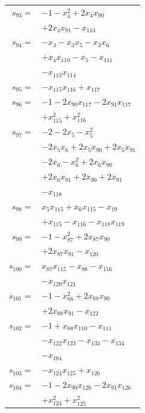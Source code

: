 \begin{longtable}{@{}r@{\;}l@{}}
\(s_{93}=\) & \(\displaystyle -1 -x_{4}^{2} +2x_{4}x_{90}\) \\
 & \(\displaystyle +2x_{4}x_{91} -x_{113}\) \\[3pt]
\(s_{94}=\) & \(\displaystyle -x_{3} -x_{3}x_{5} -x_{3}x_{6}\) \\
 & \(\displaystyle +x_{4}x_{110} -x_{5} -x_{111}\) \\
 & \(\displaystyle -x_{113}x_{114}\) \\[3pt]
\(s_{95}=\) & \(\displaystyle -x_{115}x_{116} +x_{117}\) \\[3pt]
\(s_{96}=\) & \(\displaystyle -1 -2x_{90}x_{117} -2x_{91}x_{117}\) \\
 & \(\displaystyle +x_{115}^{2} +x_{116}^{2}\) \\[3pt]
\(s_{97}=\) & \(\displaystyle -2 -2x_{5} -x_{5}^{2}\) \\
 & \(\displaystyle -2x_{5}x_{6} +2x_{5}x_{90} +2x_{5}x_{91}\) \\
 & \(\displaystyle -2x_{6} -x_{6}^{2} +2x_{6}x_{90}\) \\
 & \(\displaystyle +2x_{6}x_{91} +2x_{90} +2x_{91}\) \\
 & \(\displaystyle -x_{118}\) \\[3pt]
\(s_{98}=\) & \(\displaystyle x_{5}x_{115} +x_{6}x_{115} -x_{19}\) \\
 & \(\displaystyle +x_{115} -x_{116} -x_{118}x_{119}\) \\[3pt]
\(s_{99}=\) & \(\displaystyle -1 -x_{87}^{2} +2x_{87}x_{90}\) \\
 & \(\displaystyle +2x_{87}x_{91} -x_{120}\) \\[3pt]
\(s_{100}=\) & \(\displaystyle x_{87}x_{115} -x_{88} -x_{116}\) \\
 & \(\displaystyle -x_{120}x_{121}\) \\[3pt]
\(s_{101}=\) & \(\displaystyle -1 -x_{88}^{2} +2x_{88}x_{90}\) \\
 & \(\displaystyle +2x_{88}x_{91} -x_{122}\) \\[3pt]
\(s_{102}=\) & \(\displaystyle -1 +x_{88}x_{110} -x_{111}\) \\
 & \(\displaystyle -x_{122}x_{123} -x_{133} -x_{134}\) \\
 & \(\displaystyle -x_{184}\) \\[3pt]
\(s_{103}=\) & \(\displaystyle -x_{124}x_{125} +x_{126}\) \\[3pt]
\(s_{104}=\) & \(\displaystyle -1 -2x_{90}x_{126} -2x_{91}x_{126}\) \\
 & \(\displaystyle +x_{124}^{2} +x_{125}^{2}\) \\[3pt]

\end{longtable}
